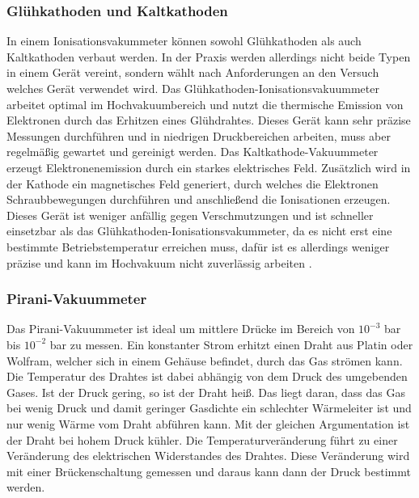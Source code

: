\subsubsection{Glühkathoden und Kaltkathoden}

In einem Ionisationsvakummeter können sowohl Glühkathoden als auch Kaltkathoden verbaut werden. In der Praxis 
werden allerdings nicht beide Typen in einem Gerät vereint, sondern wählt nach Anforderungen an den Versuch welches
Gerät verwendet wird. Das Glühkathoden-Ionisationsvakuummeter arbeitet optimal im Hochvakuumbereich und nutzt die thermische
Emission von Elektronen durch das Erhitzen eines Glühdrahtes. Dieses Gerät kann sehr präzise Messungen durchführen und in niedrigen Druckbereichen arbeiten,
muss aber regelmäßig gewartet und gereinigt werden. Das Kaltkathode-Vakuummeter erzeugt Elektronenemission durch ein starkes elektrisches Feld.
Zusätzlich wird in der Kathode ein magnetisches Feld generiert, durch welches die Elektronen Schraubbewegungen durchführen und anschließend die
Ionisationen  erzeugen. Dieses Gerät ist weniger anfällig gegen Verschmutzungen und ist schneller einsetzbar als das Glühkathoden-Ionisationsvakummeter,
da es nicht erst eine bestimmte Betriebstemperatur erreichen muss, dafür ist es allerdings weniger präzise und kann im Hochvakuum nicht zuverlässig arbeiten
\cite{Kathoden}.


\subsubsection{Pirani-Vakuummeter}
Das Pirani-Vakuummeter ist ideal um mittlere Drücke im Bereich von $10^{-3}$ bar bis $10^{-2}$ bar zu messen.
Ein konstanter Strom erhitzt einen Draht aus Platin oder Wolfram, welcher sich in einem Gehäuse befindet, durch das Gas strömen kann.
Die Temperatur des Drahtes ist dabei abhängig von dem Druck des umgebenden Gases. Ist der Druck gering, so ist der Draht heiß.
Das liegt daran, dass das Gas bei wenig Druck und damit geringer Gasdichte ein schlechter Wärmeleiter ist und nur wenig Wärme vom 
Draht abführen kann. Mit der gleichen Argumentation ist der Draht bei hohem Druck kühler. Die Temperaturveränderung führt zu einer Veränderung
des elektrischen Widerstandes des Drahtes. Diese Veränderung wird mit einer Brückenschaltung gemessen und daraus kann dann der Druck bestimmt werden.
\cite{Vakuummeter}


